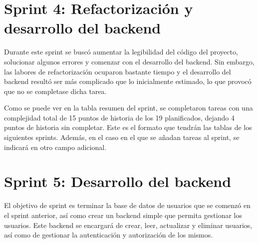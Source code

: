 \section{Sprint 4: Refactorización y desarrollo del backend}
\label{anexo3:sec:sprint4}

Durante este sprint se buscó aumentar la legibilidad del código del proyecto, solucionar algunos
errores y comenzar con el desarrollo del backend. Sin embargo, las labores de refactorización
ocuparon bastante tiempo y el desarrollo del backend resultó ser más complicado que lo inicialmente
estimado, lo que provocó que no se completase dicha tarea.

Como se puede ver en la tabla resumen del sprint, se completaron tareas con una complejidad total
de 15 puntos de historia de los 19 planificados, dejando 4 puntos de historia sin completar. Este
es el formato que tendrán las tablas de los siguientes sprints. Además, en el caso en el que se
añadan tareas al sprint, se indicará en otro campo adicional.




\section{Sprint 5: Desarrollo del backend}
\label{anexo3:sec:sprint5}

El objetivo de sprint es terminar la base de datos de usuarios que se comenzó en el sprint anterior,
así como crear un backend simple que permita gestionar los usuarios. Este backend se encargará de
crear, leer, actualizar y eliminar usuarios, así como de gestionar la autenticación y autorización
de los mismos.

